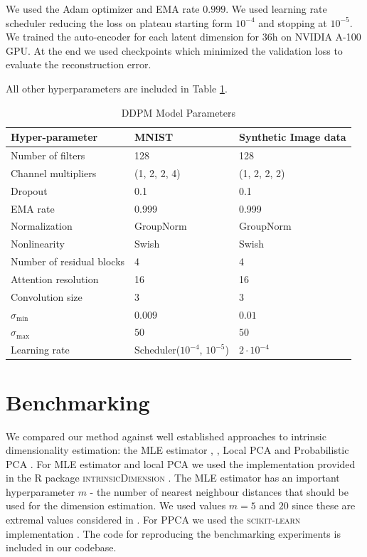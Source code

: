We used the Adam optimizer and EMA rate $0.999$. We used learning rate scheduler reducing the loss on plateau starting form $10^{-4}$ and stopping at $10^{-5}$. We trained the auto-encoder for each latent dimension for 36h on NVIDIA A-100 GPU. At the end we used checkpoints which minimized the validation loss to evaluate the reconstruction error.

All other hyperparameters are included in Table \ref{ch3:tab:model_params}.

\begin{table}[h]
\centering
\begin{tabular}{|l|l|l|}
\hline
\textbf{Hyper-parameter} & \textbf{MNIST} & \textbf{Synthetic Image data} \\
\hline
Number of filters & 128 & 128 \\
\hline
Channel multipliers & (1, 2, 2, 4) & (1, 2, 2, 2) \\
\hline
Dropout & 0.1 & 0.1 \\
\hline
EMA rate & 0.999 & 0.999 \\
\hline
Normalization & GroupNorm & GroupNorm \\
\hline
Nonlinearity & Swish & Swish \\
\hline
Number of residual blocks & 4 & 4 \\
\hline
Attention resolution & 16 & 16 \\
\hline
Convolution size & 3 & 3 \\
\hline
$\sigma_\text{min}$ & $0.009$ & $0.01$ \\
\hline
$\sigma_\text{max}$ & $50$ & $50$  \\
\hline
Learning rate & Scheduler($10^{-4}$, $10^{-5}$) & $2 \cdot 10^{-4}$ \\
\hline
\end{tabular}

\caption{DDPM Model Parameters}
\label{ch3:tab:model_params}
\end{table}

\section{Benchmarking}
\label{ch3:sec:benchmark}
We compared our method against well established approaches to intrinsic dimensionality estimation: the MLE estimator \cite{dim_MLE}, \cite{haro_mle}, Local PCA \cite{fan_local_pca} and Probabilistic PCA \cite{auto_ppca} \cite{ppca}. For MLE estimator and local PCA we used the implementation provided in the R package  \textsc{intrinsicDimension} \cite{R_intrinsic_dim}. The MLE estimator has an important hyperparameter $m$ - the number of nearest neighbour distances that should be used for the dimension estimation. We used values $m=5$ and $20$ since these are extremal values considered in \cite{pope2021intrinsic}. For PPCA we used the \textsc{scikit-learn} implementation \cite{sklearn}. The code for reproducing the benchmarking experiments is included in our codebase.

